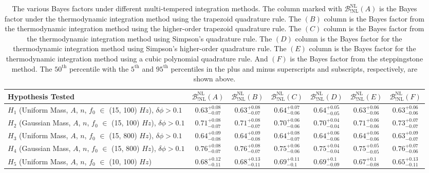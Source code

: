 \newpage
\begin{table}[ht]
\begin{adjustbox}{angle=90}
\begin{tabularx}{1.0\textwidth}{l c c c c c c}
\hline\hline
 Hypothesis Tested  & $\mathcal{B}^{\mathrm{NL}}_{\mathrm{!NL}}(A)$  & $\mathcal{B}^{\mathrm{NL}}_{\mathrm{!NL}}(B)$ & $\mathcal{B}^{\mathrm{NL}}_{\mathrm{!NL}}(C)$ & $\mathcal{B}^{\mathrm{NL}}_{\mathrm{!NL}}(D)$ & $\mathcal{B}^{\mathrm{NL}}_{\mathrm{!NL}}(E)$ & $\mathcal{B}^{\mathrm{NL}}_{\mathrm{!NL}}(F)$\\
\hline\hline
$H_1$ (Uniform Mass, $A$, $n$, $f_0$ $\in$ (15, 100) $Hz$), $\delta \phi > 0.1$ &
$0.63^{+0.08}_{-0.07}$ & $0.63^{+0.08}_{-0.07}$ & $0.64^{+0.07}_{-0.06}$ & $0.64^{+0.05}_{-0.05}$ & $0.63^{+0.06}_{-0.06}$ & $0.63^{+0.06}_{-0.06}$ \\ 
\hline
$H_2$ (Gaussian Mass, $A$, $n$, $f_0$ $\in$ (15, 100) $Hz$), $\delta \phi > 0.1$ &
$0.71^{+0.08}_{-0.07}$ & $0.71^{+0.08}_{-0.07}$ & $0.70^{+0.06}_{-0.06}$ & $0.70^{+0.04}_{-0.04}$ & $0.71^{+0.06}_{-0.06}$ & $0.73^{+0.07}_{-0.07}$ \\ 
\hline
$H_3$ (Uniform Mass, $A$, $n$, $f_0$ $\in$ (15, 800) $Hz$), $\delta \phi > 0.1$ &
$0.64^{+0.09}_{-0.08}$ & $0.64^{+0.09}_{-0.08}$ & $0.64^{+0.08}_{-0.07}$ & $0.64^{+0.06}_{-0.06}$ & $0.64^{+0.06}_{-0.06}$ & $0.63^{+0.09}_{-0.07}$ \\ 
\hline
$H_4$ (Gaussian Mass, $A$, $n$, $f_0$ $\in$ (15, 800) $Hz$), $\delta \phi > 0.1$ &
$0.76^{+0.08}_{-0.07}$ & $0.76^{+0.08}_{-0.07}$ & $0.75^{+0.06}_{-0.06}$ & $0.75^{+0.04}_{-0.04}$ & $0.75^{+0.05}_{-0.05}$ & $0.76^{+0.07}_{-0.06}$ \\ 
\hline
$H_5$ (Uniform Mass, $A$, $n$, $f_0$ $\in$ (10, 100) $Hz$) &
$0.68^{+0.12}_{-0.11}$ & $0.68^{+0.13}_{-0.11}$ & $0.69^{+0.11}_{-0.1}$ & $0.69^{+0.1}_{-0.09}$ & $0.67^{+0.1}_{-0.08}$ & $0.65^{+0.13}_{-0.11}$ \\
\hline\hline
\end{tabularx}
\end{adjustbox}
\caption{The various Bayes factors under different multi-tempered integration methods. The column marked with $\mathcal{B}^{\mathrm{NL}}_{\mathrm{!NL}}(A)$ is the Bayes factor under the thermodynamic integration method using the trapezoid quadrature rule. The $(B)$ column is the Bayes factor from the thermodynamic integration method using the higher-order trapezoid quadrature rule. The $(C)$ column is the Bayes factor from the thermodynamic integration method using Simpson's quadrature rule. The $(D)$ column is the Bayes factor for the thermodynamic integration method using Simpson's higher-order quadrature rule. The $(E)$ column is the Bayes factor for the thermodynamic integration method using a cubic polynomial quadrature rule. And $(F)$ is the Bayes factor from the steppingstone method. The $50^{\mathrm{th}}$ percentile with the $5^{\mathrm{th}}$ and $95^{\mathrm{th}}$ percentiles in the plus and minus superscripts and subscripts, respectively, are shown above.}\label{table:Bayes}
\end{table}

